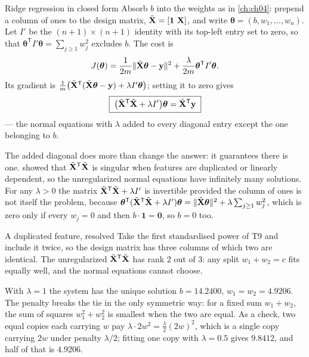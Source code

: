 \begin{derivation}{Ridge regression in closed form}
Absorb $b$ into the weights as in \cref{ch:ch04}: prepend a column of ones to
the design matrix, $\tilde\Xmat = [\mathbf{1}\ \Xmat]$, and write
$\boldsymbol\theta = (b, w_1, \dots, w_n)$. Let $I'$ be the
$(n+1)\times(n+1)$ identity with its top-left entry set to zero, so that
$\boldsymbol\theta^{\mathsf{T}}I'\boldsymbol\theta = \sum_{j\ge1}w_j^2$ excludes
$b$. The cost is
\[
  J(\boldsymbol\theta) = \frac{1}{2m}\|\tilde{\mathbf{X}}\boldsymbol\theta - \mathbf{y}\|^2
                       + \frac{\lambda}{2m}\boldsymbol\theta^{\mathsf{T}}I'\boldsymbol\theta .
\]
Its gradient is
$\frac1m\bigl(\tilde{\mathbf{X}}^{\mathsf{T}}(\tilde{\mathbf{X}}\boldsymbol\theta - \mathbf{y})
+ \lambda I'\boldsymbol\theta\bigr)$; setting it to zero gives
\[
  \boxed{\;\bigl(\tilde{\mathbf{X}}^{\mathsf{T}}\tilde{\mathbf{X}} + \lambda I'\bigr)\boldsymbol\theta
  = \tilde{\mathbf{X}}^{\mathsf{T}}\mathbf{y}\;}
\]
--- the normal equations with $\lambda$ added to every diagonal entry except
the one belonging to $b$.
\end{derivation}

The added diagonal does more than change the answer: it guarantees there is one.
 showed that $\tilde{\mathbf{X}}^{\mathsf{T}}\tilde{\mathbf{X}}$ is singular
when features are duplicated or linearly dependent, so the unregularized normal
equations have infinitely many solutions. For any $\lambda > 0$ the matrix
$\tilde{\mathbf{X}}^{\mathsf{T}}\tilde{\mathbf{X}} + \lambda I'$ is invertible provided the
column of ones is not itself the problem, because
$\boldsymbol\theta^{\mathsf{T}}(\tilde{\mathbf{X}}^{\mathsf{T}}\tilde{\mathbf{X}} + \lambda
I')\boldsymbol\theta = \|\tilde{\mathbf{X}}\boldsymbol\theta\|^2 + \lambda\sum_{j\ge1}w_j^2$,
which is zero only if every $w_j = 0$ and then $b\cdot\mathbf{1} = \mathbf{0}$,
so $b = 0$ too.

\begin{workedexample}{A duplicated feature, resolved}
Take the first standardised power of T9 and include it twice, so the design
matrix has three columns of which two are identical. The unregularized
$\tilde{\mathbf{X}}^{\mathsf{T}}\tilde{\mathbf{X}}$ has rank $2$ out of $3$: any split
$w_1 + w_2 = c$ fits equally well, and the normal equations cannot choose.

With $\lambda = 1$ the system has the unique solution $b = 14.2400$,
$w_1 = w_2 = 4.9206$. The penalty breaks the tie in the only symmetric way:
for a fixed sum $w_1 + w_2$, the sum of squares $w_1^2 + w_2^2$ is smallest
when the two are equal. As a check, two equal copies each carrying $w$ pay
$\lambda\cdot 2w^2 = \tfrac{\lambda}{2}(2w)^2$, which is a single copy carrying
$2w$ under penalty $\lambda/2$; fitting one copy with $\lambda = 0.5$ gives
$9.8412$, and half of that is $4.9206$.
\end{workedexample}

